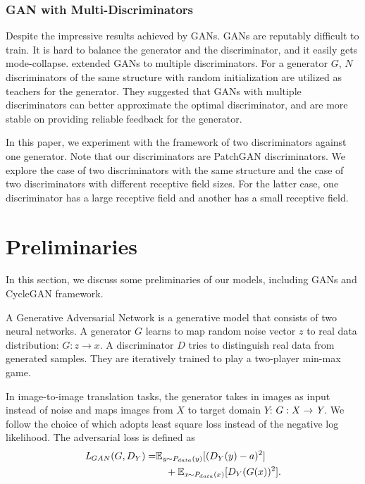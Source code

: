 \documentclass[letterpaper]{article} %
\begin{document}
	
	
	
	
	\subsubsection{GAN with Multi-Discriminators}
	Despite the impressive results achieved by GANs. GANs are reputably difficult to train. It is hard to balance the generator and the discriminator, and it easily gets mode-collapse. \cite{durugkar2016generative} extended GANs to multiple discriminators. For a generator $G$, $N$ discriminators of the same structure with random initialization are utilized as teachers for the generator. They suggested that GANs with multiple discriminators can better approximate the optimal discriminator, and are more stable on providing reliable feedback for the generator.
	
	In this paper, we experiment with the framework of two discriminators against one generator. Note that our discriminators are PatchGAN discriminators. We explore the case of two discriminators with the same structure and the case of two discriminators with different receptive field sizes. For the latter case, one discriminator has a large receptive field and another has a small receptive field. 
	
	\section{Preliminaries}
	In this section, we discuss some preliminaries of our models, including GANs and CycleGAN framework.
	
	A Generative Adversarial Network is a generative model that consists of two neural networks. A generator $G$ learns to map random noise vector $z$ to real data distribution: $ G : z \rightarrow x $. A discriminator $D$ tries to distinguish real data from generated samples. They are iteratively trained to play a two-player min-max game. 
	
	In image-to-image translation tasks, the generator takes in images as input instead of noise and maps images from $X$ to target domain $Y$: $ G : X \rightarrow \emph{Y} $. We follow the choice of \cite{zhu2017unpaired} which adopts least square loss instead of the negative log likelihood. The adversarial loss is defined as
	\begin{align}
	\emph{L}_{GAN}(G,D_Y) = &\mathbb{E}_{\emph{y} \sim P_{data}(y) }[(D_Y(y)-a)^2]  \nonumber\\ 
	&~~~ +\mathbb{E}_{\emph{x} \sim P_{data}(x) }[D_Y(G(x))^2].
	\end{align}
	
\end{document}
